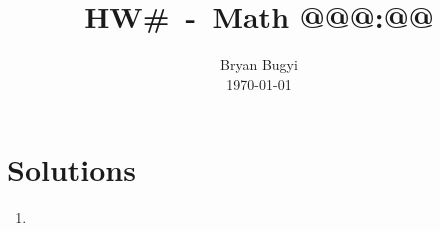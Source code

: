 \documentclass[12pt]{article}
\title{HW#~-~Math @@@:@@\vspace{-0.5cm}}
\author{Bryan Bugyi\\\today}
\date{}
\theoremstyle{remark}
\theoremstyle{case}
\begin{document}
\maketitle
\section*{Solutions}
\begin{enumerate}
   \item
\end{enumerate}
\end{document}
